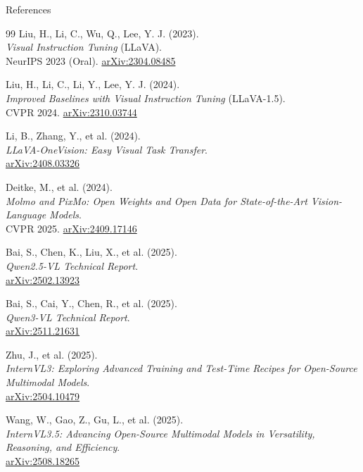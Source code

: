 \begin{frame}[allowframebreaks]{References}
\begin{thebibliography}{99}
      Liu, H., Li, C., Wu, Q., Lee, Y. J. (2023). \\
      \emph{Visual Instruction Tuning} (LLaVA).\\
      NeurIPS 2023 (Oral). \href{https://arxiv.org/abs/2304.08485}{arXiv:2304.08485}

      Liu, H., Li, C., Li, Y., Lee, Y. J. (2024). \\
      \emph{Improved Baselines with Visual Instruction Tuning} (LLaVA-1.5).\\
      CVPR 2024. \href{https://arxiv.org/abs/2310.03744}{arXiv:2310.03744}

      Li, B., Zhang, Y., et al. (2024). \\
      \emph{LLaVA-OneVision: Easy Visual Task Transfer}.\\
      \href{https://arxiv.org/abs/2408.03326}{arXiv:2408.03326}

      Deitke, M., et al. (2024). \\
      \emph{Molmo and PixMo: Open Weights and Open Data for State-of-the-Art Vision-Language Models}.\\
      CVPR 2025. \href{https://arxiv.org/abs/2409.17146}{arXiv:2409.17146}

      Bai, S., Chen, K., Liu, X., et al. (2025). \\
      \emph{Qwen2.5-VL Technical Report}.\\
      \href{https://arxiv.org/abs/2502.13923}{arXiv:2502.13923}

      Bai, S., Cai, Y., Chen, R., et al. (2025). \\
      \emph{Qwen3-VL Technical Report}.\\
      \href{https://arxiv.org/abs/2511.21631}{arXiv:2511.21631}

      Zhu, J., et al. (2025). \\
      \emph{InternVL3: Exploring Advanced Training and Test-Time Recipes for Open-Source Multimodal Models}.\\
      \href{https://arxiv.org/abs/2504.10479}{arXiv:2504.10479}

      Wang, W., Gao, Z., Gu, L., et al. (2025). \\
      \emph{InternVL3.5: Advancing Open-Source Multimodal Models in Versatility, Reasoning, and Efficiency}.\\
      \href{https://arxiv.org/abs/2508.18265}{arXiv:2508.18265}


\end{thebibliography}
\end{frame}
